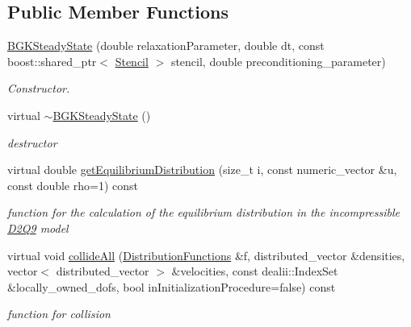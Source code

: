 \subsection*{Public Member Functions}
\begin{DoxyCompactItemize}
\item 
\hyperlink{classnatrium_1_1BGKSteadyState_a36e281915902e8ac1e347a22e382ac3f}{BGKSteadyState} (double relaxationParameter, double dt, const boost::shared\_\-ptr$<$ \hyperlink{classnatrium_1_1Stencil}{Stencil} $>$ stencil, double preconditioning\_\-parameter)
\begin{DoxyCompactList}\small\item\em Constructor. \item\end{DoxyCompactList}\item 
virtual \hyperlink{classnatrium_1_1BGKSteadyState_ab2c58f1d6b964179a2abeb5f54aa5edc}{$\sim$BGKSteadyState} ()
\begin{DoxyCompactList}\small\item\em destructor \item\end{DoxyCompactList}\item 
virtual double \hyperlink{classnatrium_1_1BGKSteadyState_ad99d9159cc14b5897bea7f145c3b39ca}{getEquilibriumDistribution} (size\_\-t i, const numeric\_\-vector \&u, const double rho=1) const 
\begin{DoxyCompactList}\small\item\em function for the calculation of the equilibrium distribution in the incompressible \hyperlink{classnatrium_1_1D2Q9}{D2Q9} model \item\end{DoxyCompactList}\item 
virtual void \hyperlink{classnatrium_1_1BGKSteadyState_a8554fb624c5a3abe01651747b3d9aeb7}{collideAll} (\hyperlink{classnatrium_1_1DistributionFunctions}{DistributionFunctions} \&f, distributed\_\-vector \&densities, vector$<$ distributed\_\-vector $>$ \&velocities, const dealii::IndexSet \&locally\_\-owned\_\-dofs, bool inInitializationProcedure=false) const 
\begin{DoxyCompactList}\small\item\em function for collision \item\end{DoxyCompactList}\end{DoxyCompactItemize}
